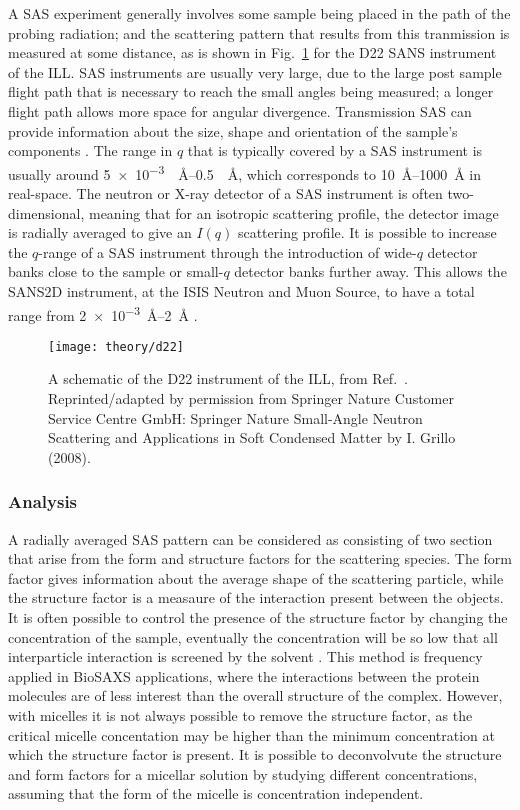 A SAS experiment generally involves some sample being placed in the path of the probing radiation; and the scattering pattern that results from this tranmission is measured at some distance, as is shown in Fig.~\ref{fig:sasgeo} for the D22 SANS instrument of the ILL.
SAS instruments are usually very large, due to the large post sample flight path that is necessary to reach the small angles being measured; a longer flight path allows more space for angular divergence.
Transmission SAS can provide information about the size, shape and orientation of the sample's components \cite{Willis2009}.
The range in $q$ that is typically covered by a SAS instrument is usually around \SIrange{5e-3}{0.5}{\per\angstrom}, which corresponds to \SIrange{10}{1000}{\angstrom} in real-space. The neutron or X-ray detector of a SAS instrument is often two-dimensional, meaning that for an isotropic scattering profile, the detector image is radially averaged to give an $I(q)$ scattering profile.
It is possible to increase the $q$-range of a SAS instrument through the introduction of wide-$q$ detector banks close to the sample or small-$q$ detector banks further away.
This allows the SANS2D instrument, at the ISIS Neutron and Muon Source, to have a total range from \SIrange{2e-3}{2}{\angstrom} \cite{sans2d2016}.
%
\begin{figure}
	\centering
	\texttt{[image: theory/d22]}
	\caption{A schematic of the D22 instrument of the ILL, from Ref.~\cite{Grillo2008}. Reprinted/adapted by permission from Springer Nature Customer Service Centre GmbH: Springer Nature Small-Angle Neutron Scattering and Applications in Soft Condensed Matter by I. Grillo\textsuperscript{\textcopyright} (2008).}
	\label{fig:sasgeo}
\end{figure}
%

\subsubsection{Analysis}

A radially averaged SAS pattern can be considered as consisting of two section that arise from the form and structure factors for the scattering species.
The form factor gives information about the average shape of the scattering particle, while the structure factor is a measaure of the interaction present between the objects.
It is often possible to control the presence of the structure factor by changing the concentration of the sample, eventually the concentration will be so low that all interparticle interaction is screened by the solvent \cite{Edler2015}.
This method is frequency applied in BioSAXS applications, where the interactions between the protein molecules are of less interest than the overall structure of the complex.
However, with micelles it is not always possible to remove the structure factor, as the critical micelle concentation may be higher than the minimum concentration at which the structure factor is present.
It is possible to deconvolvute the structure and form factors for a micellar solution by studying different concentrations, assuming that the form of the micelle is concentration independent.

